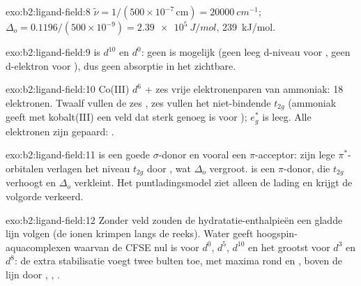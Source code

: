 \begin{solution}{exo:b2:ligand-field:8}
$\tilde\nu = 1/(500 \times 10^{-7}\,\text{cm}) = \qty{20000}{cm^{-1}}$; $\Delta_o =
0.1196/(500 \times 10^{-9}) = \qty{2.39e5}{J/mol}$, \qty{239}{kJ/mol}.
\end{solution}

\begin{solution}{exo:b2:ligand-field:9}
 is $d^{10}$ en  $d^0$: geen  is mogelijk (geen leeg d-niveau
voor , geen d-elektron voor ), dus geen absorptie in het zichtbare.
\end{solution}

\begin{solution}{exo:b2:ligand-field:10}
Co(III) $d^6$ + zes vrije elektronenparen van ammoniak: 18 elektronen. Twaalf vullen de zes ,
zes vullen het niet-bindende $t_{2g}$ (ammoniak geeft met kobalt(III) een veld dat sterk genoeg is voor
); $e_g^*$ is leeg. Alle elektronen zijn gepaard: .
\end{solution}

\begin{solution}{exo:b2:ligand-field:11}
 is een goede $\sigma$-donor en vooral een $\pi$-acceptor: zijn lege $\pi^*$-orbitalen
verlagen het niveau $t_{2g}$ door , wat $\Delta_o$ vergroot.  is een $\pi$-donor, die
$t_{2g}$ verhoogt en $\Delta_o$ verkleint. Het puntladingsmodel ziet alleen de lading en krijgt de
volgorde verkeerd.
\end{solution}

\begin{solution}{exo:b2:ligand-field:12}
Zonder veld zouden de hydratatie-enthalpieën een gladde lijn volgen (de ionen krimpen langs
de reeks). Water geeft hoogspin-aquacomplexen waarvan de CFSE nul is voor $d^0$, $d^5$, $d^{10}$
en het grootst voor $d^3$ en $d^8$: de extra stabilisatie voegt twee bulten toe, met maxima rond
 en , boven de lijn door , , .
\end{solution}

